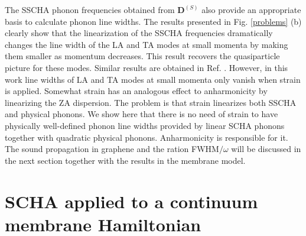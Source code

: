 The SSCHA phonon frequencies obtained from $\boldsymbol{D}^{(S)}$ also provide an appropriate basis to calculate 
phonon line widths\cite{bianco2017second,aseginolaza2019phonon}. The results presented in Fig. \ref{problems} (b) 
clearly show that the linearization of the SSCHA frequencies dramatically changes the line width of the LA and TA 
modes at small momenta by making them smaller as momentum decreases. This result recovers the quasiparticle picture 
for these modes. Similar results are obtained in Ref. \cite{bonini2012acoustic}. However, in this work line widths of 
LA and TA modes at small momenta only vanish when strain is applied. Somewhat strain has an analogous effect to 
anharmonicity by linearizing the ZA dispersion. The problem is that strain linearizes both SSCHA and physical 
phonons. We show here that there is no need of strain to have physically well-defined phonon line widths provided by 
linear SCHA phonons together with quadratic physical phonons. Anharmonicity is responsible for it. The sound 
propagation in graphene and the ration FWHM$/\omega$ will be discussed in the next section together with the results 
in the membrane model.

\section{SCHA applied to a continuum membrane Hamiltonian}

